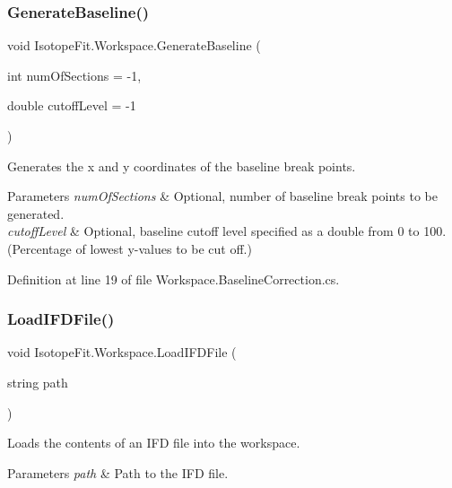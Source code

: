\subsubsection{\texorpdfstring{Generate\+Baseline()}{GenerateBaseline()}}
{\footnotesize\ttfamily void Isotope\+Fit.\+Workspace.\+Generate\+Baseline (\begin{DoxyParamCaption}\item[{int}]{num\+Of\+Sections = {\ttfamily -\/1},  }\item[{double}]{cutoff\+Level = {\ttfamily -\/1} }\end{DoxyParamCaption})}



Generates the x and y coordinates of the baseline break points. 


\begin{DoxyParams}{Parameters}
{\em num\+Of\+Sections} & Optional, number of baseline break points to be generated.\\
\hline
{\em cutoff\+Level} & Optional, baseline cutoff level specified as a double from 0 to 100. (Percentage of lowest y-\/values to be cut off.)\\
\hline
\end{DoxyParams}


Definition at line 19 of file Workspace.\+Baseline\+Correction.\+cs.

\mbox{\label{class_isotope_fit_1_1_workspace_a55061c1f05d3e02d2d591fe6211d2f1f}} 
\subsubsection{\texorpdfstring{Load\+I\+F\+D\+File()}{LoadIFDFile()}}
{\footnotesize\ttfamily void Isotope\+Fit.\+Workspace.\+Load\+I\+F\+D\+File (\begin{DoxyParamCaption}\item[{string}]{path }\end{DoxyParamCaption})}



Loads the contents of an I\+FD file into the workspace. 


\begin{DoxyParams}{Parameters}
{\em path} & Path to the I\+FD file.\\
\hline
\end{DoxyParams}


